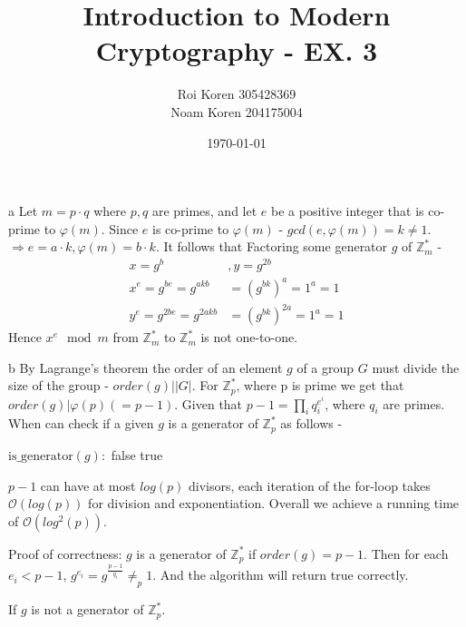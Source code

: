 \documentclass{article}
\begin{document}
\title{Introduction to Modern Cryptography - EX. 3}
\author{Roi Koren 305428369\\ Noam Koren 204175004}
\date{\today}
\maketitle
\newpage
{}

\section{}
\begin{paragraph}
	a Let $m=p\cdot q$ where $p,q$ are primes, and let $e$ be a 
	positive integer that is co-prime to $\varphi(m)$.
	Since $e$ is co-prime to $\varphi(m)$ - $gcd(e, \varphi(m)) = k \neq 1$.
	$\Rightarrow e = a\cdot k, \varphi(m) = b\cdot k$. It follows that Factoring
	some generator $g$ of $\mathbb{Z}^*_m$ - 
	\begin{align*}
		x = g^b&, y = g^{2b}\\
		x^e = g^{be} = g^{akb} &= (g^{bk})^a = 1^a = 1 \\
		y^e = g^{2be} = g^{2akb} &= (g^{bk})^{2a} = 1^a = 1
	\end{align*}
	Hence $x^e \mod m$ from $\mathbb{Z}^*_m$ to $\mathbb{Z}^*_m$ is not one-to-one.
\end{paragraph}

\begin{paragraph}
	b By Lagrange's theorem the order of an element $g$ of a group $G$
	must divide the size of the group - $order(g)| |G|$. For $\mathbb{Z}^*_p$,
	where p is prime we get that $order(g) | \varphi(p)(=p-1)$.
	Given that $p-1 =\prod_i{q_i^{e^i}}$, where $q_i$ are primes. When can
	check if a given $g$ is a generator of $\mathbb{Z}^*_p$ as follows - 

	\begin{algorithm}
	\begin{algorithmic}[1]
		\State $\text{is\_generator}( \textit{g} ):$
			 \Return false
			\EndIf
		  \EndFor
		\State \Return true
	\end{algorithmic}
	\end{algorithm}

	$p-1$ can have at most $log(p)$ divisors, each iteration of the for-loop
	takes $\mathcal{O}(log(p))$ for division and exponentiation. Overall we achieve
	a running time of $\mathcal{O}(log^2(p))$.

	Proof of correctness: $g$ is a generator of $\mathbb{Z}^*_p$ if $order(g) = p -1$.
	Then for each $e_i < p - 1$, $g^{e_i} = g^{\frac{p-1}{q_i}} \neq_p 1$. And the 
	algorithm will return true correctly.

	If $g$ is not a generator of $\mathbb{Z}^*_p$.

\end{paragraph}
\end{document}
